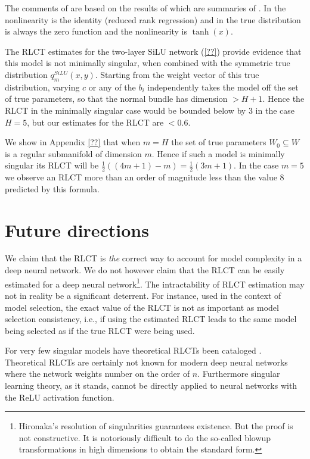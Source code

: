 \documentclass{article} %
\begin{document}
The comments of \citep[\S 7.6]{watanabe_algebraic_2009} are based on the results of \citep[\S 7.2]{watanabe_algebraic_2009} which are summaries of \cite{??,??}. In \cite{??} the nonlinearity is the identity (reduced rank regression) and in \cite{??} the true distribution is always the zero function and the nonlinearity is $\operatorname{tanh}(x)$.

The RLCT estimates for the two-layer SiLU network (\ref{??}) provide evidence that this model is not minimally singular, when combined with the symmetric true distribution $q^{SiLU}_m(x,y)$. Starting from the weight vector of this true distribution, varying $c$ or any of the $b_i$ independently takes the model off the set of true parameters, so that the normal bundle has dimension $> H + 1$. Hence the RLCT in the minimally singular case would be bounded below by $3$ in the case $H = 5$, but our estimates for the RLCT are $< 0.6$.

We show in Appendix \ref{??} that when $m = H$ the set of true parameters $W_0 \subseteq W$ is a regular submanifold of dimension $m$. Hence if such a model is minimally singular its RLCT will be $\tfrac{1}{2}( (4m + 1) - m ) = \tfrac{1}{2}( 3m + 1 )$. In the case $m = 5$ we observe an RLCT more than an order of magnitude less than the value $8$ predicted by this formula.

\section{Future directions}
We claim that the RLCT is \textit{the} correct way to account for model complexity in a deep neural network. We do not however claim that the RLCT can be easily estimated for a deep neural network\footnote{Hironaka's resolution of singularities guarantees existence. But the proof is not constructive. It is notoriously difficult to do the so-called blowup transformations in high dimensions to obtain the standard form.}. The intractability of RLCT estimation may not in reality be a significant deterrent. For instance, used in the context of model selection, the exact value of the RLCT is not as important as model selection consistency, i.e., if using the estimated RLCT leads to the same model being selected as if the true RLCT were being used. 

For very few singular models have theoretical RLCTs been cataloged \citep{}. Theoretical RLCTs are certainly not known for modern deep neural networks where the network weights number on the order of $n$. Furthermore singular learning theory, as it stands, cannot be directly applied to neural networks with the ReLU activation function. 
\end{document}
